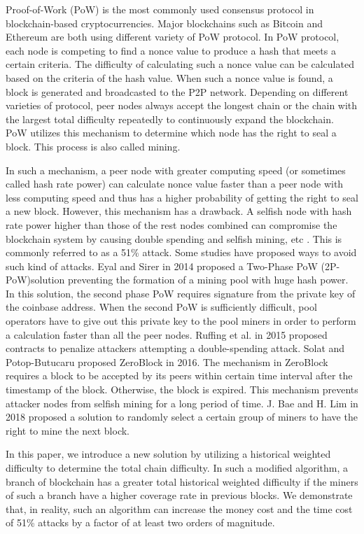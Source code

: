 \documentclass[conference]{IEEEtran}
\begin{document}
Proof-of-Work (PoW) is the most commonly used consensus protocol in blockchain-based cryptocurrencies. Major blockchains such as Bitcoin and Ethereum are both using different variety of PoW protocol. In PoW protocol, each node is competing to find a nonce value to produce a hash that meets a certain criteria. The difficulty of calculating such a nonce value can be calculated based on the criteria of the hash value. When such a nonce value is found, a block is generated and broadcasted to the P2P network. Depending on different varieties of protocol, peer nodes always accept the longest chain or the chain with the largest total difficulty repeatedly to continuously expand the blockchain. PoW utilizes this mechanism to determine which node has the right to seal a block. This process is also called mining.

In such a mechanism, a peer node with greater computing speed (or sometimes called hash rate power) can calculate nonce value faster than a peer node with less computing speed and thus has a higher probability of getting the right to seal a new block. However, this mechanism has a drawback. A selfish node with hash rate power higher than those of the rest nodes combined can compromise the blockchain system by causing double spending and selfish mining, etc \cite{b3}\cite{b4}. This is commonly referred to as a 51\% attack. Some studies have proposed ways to avoid such kind of attacks. Eyal and Sirer \cite{b5} in 2014 proposed a Two-Phase PoW (2P-PoW)solution preventing the formation of a mining pool with huge hash power. In this solution, the second phase PoW requires signature from the private key of the coinbase address. When the second PoW is sufficiently difficult, pool operators have to give out this private key to the pool miners in order to perform a calculation faster than all the peer nodes. Ruffing et al. \cite{b6} in 2015 proposed contracts to penalize attackers attempting a double-spending attack. Solat and Potop-Butucaru proposed ZeroBlock \cite{b7} in 2016. The mechanism in ZeroBlock requires a block to be accepted by its peers within certain time interval after the timestamp of the block. Otherwise, the block is expired. This mechanism prevents attacker nodes from selfish mining for a long period of time. J. Bae and H. Lim \cite{b8} in 2018 proposed a solution to randomly select a certain group of miners to have the right to mine the next block.

In this paper, we introduce a new solution by utilizing a historical weighted difficulty to determine the total chain difficulty. In such a modified algorithm, a branch of blockchain has a greater total historical weighted difficulty if the miners of such a branch have a higher coverage rate in previous blocks. We demonstrate that, in reality, such an algorithm can increase the money cost and the time cost of 51\% attacks by a factor of at least two orders of magnitude.
\end{document}
